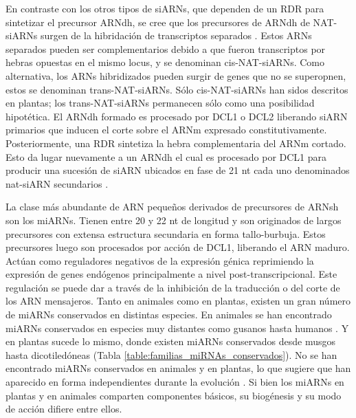 En contraste con los otros tipos de siARNs, que dependen de un RDR para sintetizar el precursor ARNdh, se cree que los precursores de ARNdh de NAT-siARNs surgen de la hibridación de transcriptos separados \citep{pmid16377568,pmid17071740}.
Estos ARNs separados pueden ser complementarios debido a que fueron transcriptos por hebras opuestas en el mismo locus, y se denominan cis-NAT-siARNs.
Como alternativa, los ARNs hibridizados pueden surgir de genes que no se superopnen, estos se denominan trans-NAT-siARNs.
Sólo cis-NAT-siARNs han sidos descritos en plantas; los trans-NAT-siARNs permanecen sólo como una posibilidad hipotética.
El ARNdh formado es procesado por DCL1 o DCL2 liberando siARN primarios que inducen el corte sobre el ARNm expresado constitutivamente.
Posteriormente, una RDR sintetiza la hebra complementaria del ARNm cortado. 
Esto da lugar nuevamente a un ARNdh el cual es procesado por DCL1 para producir una sucesión de siARN ubicados en fase de 21 nt cada uno denominados nat-siARN secundarios \citep{pmid16377568,pmid17071740}.

La clase más abundante de ARN pequeños derivados de precursores de ARNsh son los miARNs.
Tienen entre 20 y 22 nt de longitud y son originados de largos precursores con extensa estructura secundaria en forma tallo-burbuja.
Estos precursores luego son procesados por acción de DCL1, liberando el ARN maduro. 
Actúan como reguladores negativos de la expresión génica reprimiendo la expresión de genes endógenos principalmente a nivel post-transcripcional.
Este regulación se puede dar a través de la inhibición de la traducción o del corte de los ARN mensajeros.
Tanto en animales como en plantas, existen un gran número de miARNs conservados en distintas especies.
En animales se han encontrado miARNs conservados en especies muy distantes como gusanos hasta humanos \citep{pmid11081512}.
Y en plantas sucede lo mismo, donde existen miARNs conservados desde musgos hasta dicotiledóneas \citep{pmid15849273,Axtell2008343,citeulike:8816489} (Tabla \ref{table:familias_miRNAs_conservados}).
No se han encontrado miARNs conservados en animales y en plantas, lo que sugiere que han aparecido en forma independientes durante la evolución \citep{citeulike:8816489}.
Si bien los miARNs en plantas y en animales comparten componentes básicos, su biogénesis y su modo de acción difiere entre ellos.



